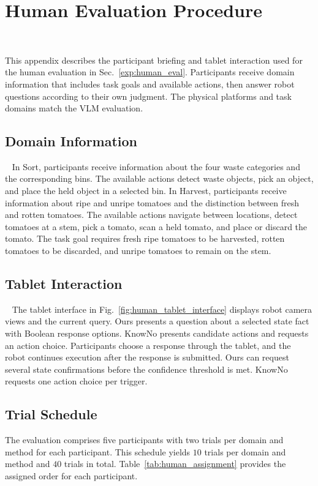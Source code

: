 \section{Human Evaluation Procedure}~\label{appx:user}

This appendix describes the participant briefing and tablet interaction used for the human evaluation in Sec.~\ref{exp:human_eval}. Participants receive domain information that includes task goals and available actions, then answer robot questions according to their own judgment. The physical platforms and task domains match the VLM evaluation.

\subsection{Domain Information}~\label{appx:user_scenarios}
In Sort, participants receive information about the four waste categories and the corresponding bins. The available actions detect waste objects, pick an object, and place the held object in a selected bin. In Harvest, participants receive information about ripe and unripe tomatoes and the distinction between fresh and rotten tomatoes. The available actions navigate between locations, detect tomatoes at a stem, pick a tomato, scan a held tomato, and place or discard the tomato. The task goal requires fresh ripe tomatoes to be harvested, rotten tomatoes to be discarded, and unripe tomatoes to remain on the stem.

\subsection{Tablet Interaction}~\label{appx:user_assignment}
The tablet interface in Fig.~\ref{fig:human_tablet_interface} displays robot camera views and the current query. Ours presents a question about a selected state fact with Boolean response options. KnowNo presents candidate actions and requests an action choice. Participants choose a response through the tablet, and the robot continues execution after the response is submitted. Ours can request several state confirmations before the confidence threshold is met. KnowNo requests one action choice per trigger.

\subsection{Trial Schedule}
The evaluation comprises five participants with two trials per domain and method for each participant. This schedule yields $10$ trials per domain and method and $40$ trials in total. Table~\ref{tab:human_assignment} provides the assigned order for each participant.

